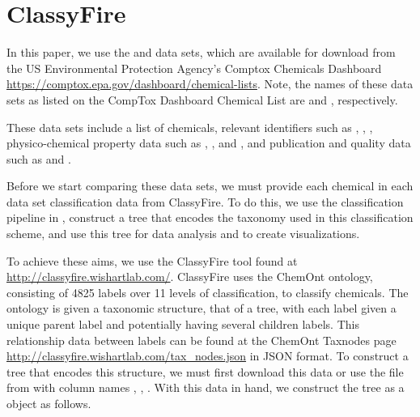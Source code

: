 \documentclass[article]{jss}
\begin{document}
\section{ClassyFire} \label{sec:class}

In this paper, we use the  and  data sets, which are available for download from the US Environmental Protection Agency's Comptox Chemicals Dashboard \url{https://comptox.epa.gov/dashboard/chemical-lists}. Note, the names of these data sets as listed on the CompTox Dashboard Chemical List are  and , respectively.

These data sets include a list of chemicals, relevant identifiers such as , , , physico-chemical property data such as , , and  , and publication and quality data such as  and .

Before we start comparing these data sets, we must provide each chemical in each data set classification data from ClassyFire. To do this, we use the classification pipeline in , construct a tree that encodes the taxonomy used in this classification scheme, and use this tree for data analysis and to create visualizations.

To achieve these aims, we use the ClassyFire tool found at \url{http://classyfire.wishartlab.com/}. ClassyFire uses the ChemOnt ontology, consisting of 4825 labels over 11 levels of classification, to classify chemicals. The ontology is given a taxonomic structure, that of a tree, with each label given a unique parent label and potentially having several children labels. This relationship data between labels can be found at the ChemOnt Taxnodes page \url{http://classyfire.wishartlab.com/tax_nodes.json} in JSON format. To construct a tree that encodes this structure, we must first download this data or use the file  from  with column names , , . With this data in hand, we construct the tree as a  object as follows.
\end{document}
